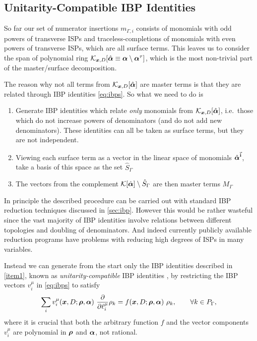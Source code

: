 \subsection{Unitarity-Compatible IBP Identities}
\label{sec:unitarity_compatible_ibps}
So far our set of numerator insertions $m_{\Gamma,i}$ consists of monomials with odd powers of transverse ISPs and traceless-completions of
monomials with even powers of transverse ISPs, which are all surface terms.
This leaves us to consider the span of polynomial ring $\mathcal{K}_{\vb*{x},D}[\hat{\vb*{\alpha}}\equiv \vb*{\alpha}\setminus\vb*{\alpha}^\tau]$,
which is the most non-trivial part of the master/surface decomposition.

The reason why not all terms from $\mathcal{K}_{\vb*{x},D}[\hat{\vb*{\alpha}}]$ are master terms is that they are
related through IBP identities \eqref{eq:ibps}. So what we need to do is
\begin{enumerate}
  \item Generate IBP identities which relate
    \emph{only} monomials from $\mathcal{K}_{\vb*{x},D}[\hat{\vb*{\alpha}}]$, i.e.\ those which do not increase powers of denominators (and do not add new denominators).
    These identities can all be taken as surface terms, but they are not independent. 
    \label{item1}
  \item  Viewing each surface term as a vector in the linear space of monomials $\hat{\vb*{\alpha}}^{\va{i}}$, take
    a basis of this space as the set $\hat{S}_\Gamma$
    \label{item2}
  \item The vectors from the complement $\mathcal{K}[\hat{\vb*{\alpha}}]\setminus \hat{S}_\Gamma$ are then master terms $M_\Gamma$
    \label{item3}
\end{enumerate}

In principle the described procedure can be carried out with standard IBP reduction techniques discussed in \cref{sec:ibp}.
However this would be rather wasteful
since the vast majority of IBP identities involve relations between different topologies and doubling of denominators.
And indeed currently publicly available reduction programs
\cite{Studerus:2009ye,vonManteuffel:2012np, Smirnov:2008iw,Smirnov:2014hma, Lee:2012cn,Lee:2013mka, Maierhoefer:2017hyi,Maierhofer:2018gpa}
have problems with reducing high degrees of ISPs in many variables.

Instead we can generate from the start only the IBP identities described in \cref{item1},
known as \emph{unitarity-compatible} IBP identities \cite{Gluza:2010ws,Schabinger:2011dz,Ita:2015tya}, by
restricting the IBP vectors $v_i^\mu$ in \cref{eq:ibps} to satisfy
\begin{equation} \label{eq:non_doubling_ibp_vectors}
  \sum_i v_i^\mu(\vb*{x},D;\vb*{\rho},\vb*{\alpha}) ~ \pdv{\ell^\mu_i} \rho_k = f(\vb*{x},D;\vb*{\rho},\vb*{\alpha}) ~ \rho_k, \qquad \forall k\in P_\Gamma,
\end{equation}
where it is crucial that both the arbitrary function $f$ and the vector components $v_i^\mu$ are polynomial in $\vb*{\rho}$ and $\vb*{\alpha}$, not rational.


